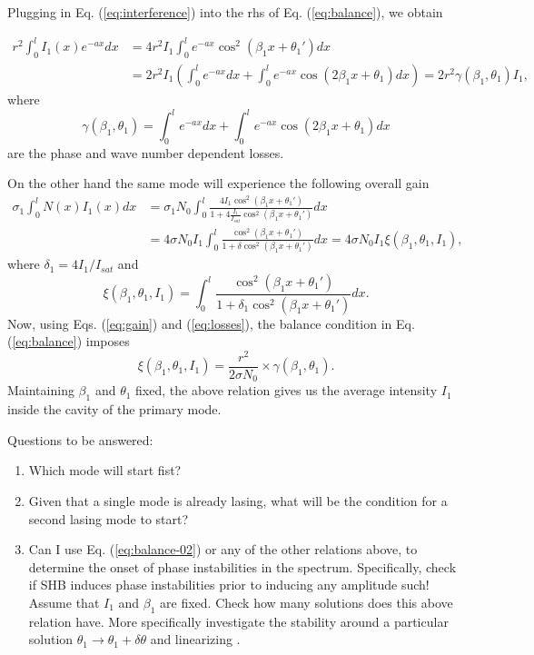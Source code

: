 \documentclass[preprint,secnumarabic,amssymb, nobibnotes, aip, prd]{revtex4-1}
\begin{document}
Plugging in Eq. (\ref{eq:interference}) into the rhs of Eq. (\ref{eq:balance}), we obtain 

\begin{align}
\label{eq:losses}
r^2\int_{0}^{l}I_1(x)e^{-ax}dx &= 4r^2I_1\int_{0}^{l}e^{-ax}\cos^2(\beta_1 x+\theta_1')dx \nonumber \\ 
&=  2r^2I_1\left(\int_{0}^{l}e^{-ax}dx + \int_{0}^{l}e^{-ax}\cos(2\beta_1 x+\theta_1)dx\right) = 2r^2\gamma(\beta_1,\theta_1) I_1,
\end{align}
where 
\begin{equation}
\label{eq:gamma-beta-teta}
\gamma(\beta_1,\theta_1) = \int_{0}^{l}e^{-ax}dx + \int_{0}^{l}e^{-ax}\cos(2\beta_1 x+\theta_1)dx
\end{equation}
are the phase and wave number dependent losses. 

On the other hand the same mode will experience the following overall gain
\begin{align}
\label{eq:gain}
\sigma_1\int_{0}^{l} N(x)I_1(x)dx &= \sigma_1 N_0 \int_{0}^{l}\frac{4I_1\cos^2(\beta_1 x+\theta_1')}{1+4\frac{I_1}{I_{sat}}\cos^2(\beta_1 x+\theta_1')}dx \nonumber \\ 
&= 4\sigma N_0I_1 \int_{0}^{l} \frac{\cos^2(\beta_1 x+\theta_1')}{1+\delta\cos^2(\beta_1 x+\theta_1')} dx  =4\sigma N_0 I_1 \xi(\beta_1,\theta_1,I_1),
\end{align}
where $\delta_1 = 4I_1/I_{sat}$ and
\begin{equation}
\label{eq:xi-beta-teta-I}
\xi(\beta_1,\theta_1,I_1) = \int_{0}^{l} \frac{\cos^2(\beta_1 x+\theta_1')}{1+\delta_1\cos^2(\beta_1 x+\theta_1')} dx.
\end{equation}
Now, using Eqs. (\ref{eq:gain}) and (\ref{eq:losses}), the balance condition in Eq. (\ref{eq:balance}) imposes 
\begin{equation}
\label{eq:balance-02}
\xi(\beta_1,\theta_1,I_1) = \frac{r^2}{2\sigma N_0} \times \gamma(\beta_1,\theta_1).
\end{equation}
Maintaining $\beta_1$ and $\theta_1$ fixed, the above relation gives us the average intensity $I_1$ inside the cavity of the primary mode.

Questions to be answered:
\begin{enumerate}
	\item Which mode will start fist?
	\item Given that a single mode is already lasing, what will be the condition for a second lasing mode to start?
	\item Can I use Eq. (\ref{eq:balance-02}) or any of the other relations above, to determine the onset of phase instabilities in the spectrum. Specifically, check if SHB induces phase instabilities prior to inducing any amplitude such! Assume that $I_1$ and $\beta_1$ are fixed. Check how many solutions does this above relation have. More specifically investigate the stability around a particular solution $\theta_1 \rightarrow \theta_1+\delta\theta$ and linearizing $$.
\end{enumerate}


\end{document}
